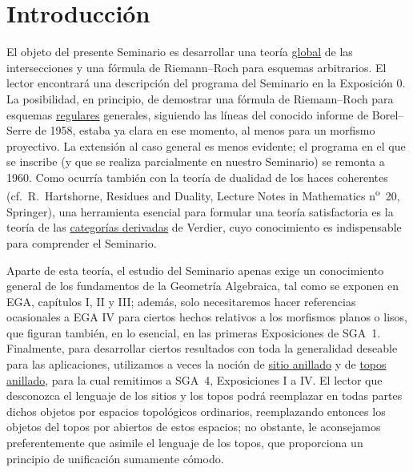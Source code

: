 \documentclass[11pt]{article}
\begin{document}
\section*{Introducción}
El objeto del presente Seminario es desarrollar una teoría
\underline{global} de las intersecciones y una fórmula de Riemann--Roch para
esquemas arbitrarios. El lector encontrará una descripción del programa del
Seminario en la Exposición 0. La posibilidad, en principio, de demostrar una
fórmula de Riemann--Roch para esquemas \underline{regulares} generales,
siguiendo las líneas del conocido informe de Borel--Serre de 1958, estaba ya
clara en ese momento, al menos para un morfismo proyectivo. La extensión al
caso general es menos evidente; el programa en el que se inscribe (y que se
realiza parcialmente en nuestro Seminario) se remonta a 1960. Como ocurría
también con la teoría de dualidad de los haces coherentes (cf.\ R.~Hartshorne,
Residues and Duality, Lecture Notes in Mathematics
n\textsuperscript{o}~20, Springer), una herramienta esencial para formular
una teoría satisfactoria es la teoría de las \underline{categorías derivadas}
de Verdier, cuyo conocimiento es indispensable para comprender el Seminario.

Aparte de esta teoría, el estudio del Seminario apenas exige un conocimiento
general de los fundamentos de la Geometría Algebraica, tal como se exponen en
EGA, capítulos I, II y III; además, solo necesitaremos hacer referencias
ocasionales a EGA IV para ciertos hechos relativos a los morfismos planos o
lisos, que figuran también, en lo esencial, en las primeras Exposiciones de
SGA~1. Finalmente, para desarrollar ciertos resultados con toda la
generalidad deseable para las aplicaciones, utilizamos a veces la noción de
\underline{sitio anillado} y de \underline{topos anillado}, para la cual
remitimos a SGA~4, Exposiciones I a IV. El lector que desconozca el lenguaje
de los sitios y los topos podrá reemplazar en todas partes dichos objetos por
espacios topológicos ordinarios, reemplazando entonces los objetos del topos
por abiertos de estos espacios; no obstante, le aconsejamos preferentemente
que asimile el lenguaje de los topos, que proporciona un principio de
unificación sumamente cómodo.
\end{document}
